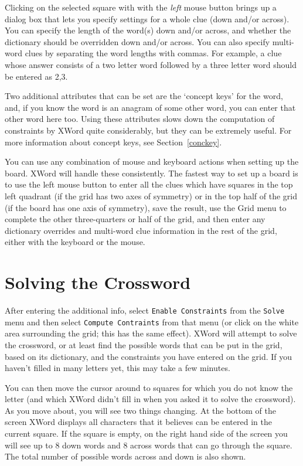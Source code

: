 Clicking on the selected square with with the {\em left} mouse button brings
up a dialog box that lets you specify settings for a whole clue
(down and/or across). You can specify the length of the word(s)
down and/or across, and whether the dictionary should be overridden
down and/or across. You can also specify multi-word clues by
separating the word lengths with commas. For example, a clue whose
answer consists of a two letter word followed by a three letter
word should be entered as 2,3.

Two additional attributes that can be set are the `concept keys'
for the word, and, if you know the word is an anagram of some 
other word, you can enter that other word here too. Using these
attributes slows down the computation of constraints by XWord
quite considerably, but they can be extremely useful. For more
information about concept keys, see Section~\ref{conckey}.

You can use any combination of mouse and keyboard actions when
setting up the board. XWord will handle these consistently.
The fastest way to set up a board is to use the left mouse button
to enter all the clues which have squares in the top left quadrant
(if the grid has two axes of symmetry) or in the top half of the
grid (if the board has one axis of symmetry), save the result,
use the Grid menu to complete the other three-quarters or half
of the grid, and then enter any dictionary overrides and multi-word
clue information in the rest of the grid, either with the keyboard 
or the mouse.

\section{Solving the Crossword}

After entering the additional info, select {\tt Enable Constraints}
from the {\tt Solve} menu and then select {\tt Compute Contraints} from that
menu (or click on the white area surrounding the grid; this has the
same effect). XWord will attempt to solve the crossword, or
at least find the possible words that can be put in the grid, based
on its dictionary, and the constraints you have entered on the grid.
If you haven't filled in many letters yet, this may take a few minutes.

You can then move the cursor around to squares for which you 
do not know the letter (and which XWord didn't fill in when
you asked it to solve the crossword).  As you move about, you
will see two things changing. At the bottom of the screen XWord
displays all characters that it believes can be entered in the
current square. If the square is empty, on the right hand side
of the screen you will see up to 8 down words and 8 across
words that can go through the square. The total number of possible
words across and down is also shown.

